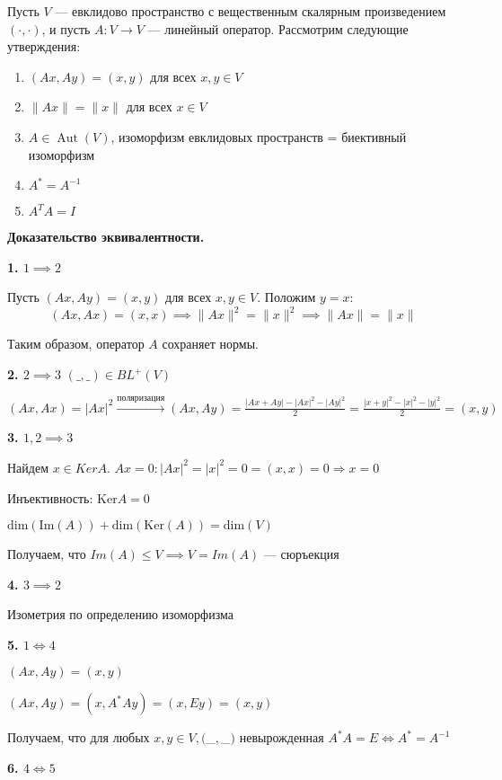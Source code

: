 \documentclass[12pt]{article}
\begin{document}
Пусть $ V $ — евклидово пространство с вещественным скалярным произведением $ (\cdot, \cdot) $, и пусть $ A: V \to V $ — линейный оператор. Рассмотрим следующие утверждения:

\begin{enumerate}
    \item $ (Ax, Ay) = (x, y) $ для всех $ x, y \in V $
    \item $ \|Ax\| = \|x\| $ для всех $ x \in V $
    \item $ A \in \operatorname{Aut}(V) $, изоморфизм евклидовых пространств = биективный изоморфизм
    \item $ A^* = A^{-1} $
    \item $ A^T A = I $
\end{enumerate}

\textbf{Доказательство эквивалентности.}

\textbf{1. $ 1 \implies 2 $}

Пусть $ (Ax, Ay) = (x, y) $ для всех $ x, y \in V $. Положим $ y = x $:
$$
(Ax, Ax) = (x, x)
\implies \|Ax\|^2 = \|x\|^2
\implies \|Ax\| = \|x\|
$$

Таким образом, оператор $ A $ сохраняет нормы.

\textbf{2. $ 2 \implies 3 $}
$(\_,\_) \in BL^+(V)$

$(Ax,Ax) = |Ax|^2 \xrightarrow{поляризация} (Ax, Ay) = \frac{|Ax + Ay| - |Ax|^2 - |Ay|^2}{2} = \frac{|x+y|^2 - |x|^2 - |y|^2}{2} = (x,y)$

\textbf{3. $ 1, 2\implies 3 $}

Найдем $x \in KerA$.
$Ax = 0 : |Ax|^2 = |x|^2 = 0 = (x,x) =0 \Rightarrow x = 0$

Инъективность: $\mathrm{Ker}A = {0}$

$\mathrm{dim}(\mathrm{Im}(A)) + \mathrm{dim}(\mathrm{Ker}(A)) = \mathrm{dim}(V)$

Получаем, что $Im(A) \leq V \implies V = Im(A)$ — сюръекция

\textbf{4. $ 3 \implies 2 $}

Изометрия по определению изоморфизма

\textbf{5. $ 1 \Longleftrightarrow 4 $}

$(Ax, Ay) = (x,y)$

$(Ax, Ay) = (x,A^*Ay) = (x, Ey) = (x,y)$

Получаем, что для любых $x,y \in V, ($_$,$_$)$ невырожденная \implies$ A^*A = E \Longleftrightarrow A^* = A^{-1}$

\textbf{6. $ 4 \Longleftrightarrow 5 $}
\end{document}
